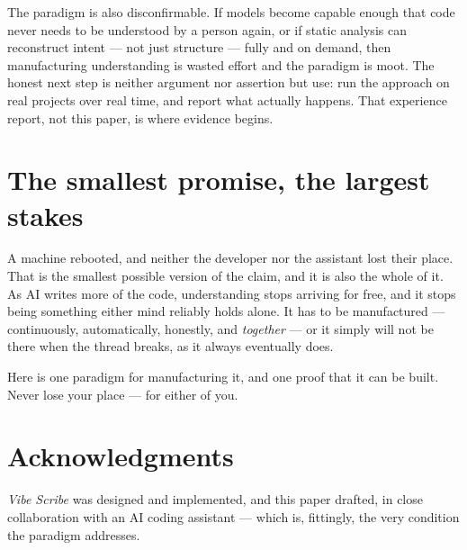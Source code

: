\documentclass[11pt]{article}
\newcommand{\vs}{\textit{Vibe Scribe}}
\begin{document}
The paradigm is also disconfirmable. If models become capable enough that code never needs to be
understood by a person again, or if static analysis can reconstruct intent --- not just structure ---
fully and on demand, then manufacturing understanding is wasted effort and the paradigm is moot. The
honest next step is neither argument nor assertion but use: run the approach on real projects over
real time, and report what actually happens. That experience report, not this paper, is where evidence
begins.

\section{The smallest promise, the largest stakes}

A machine rebooted, and neither the developer nor the assistant lost their place. That is the smallest
possible version of the claim, and it is also the whole of it. As AI writes more of the code,
understanding stops arriving for free, and it stops being something either mind reliably holds alone.
It has to be manufactured --- continuously, automatically, honestly, and \emph{together} --- or it
simply will not be there when the thread breaks, as it always eventually does.

Here is one paradigm for manufacturing it, and one proof that it can be built. Never lose your place
--- for either of you.

\section*{Acknowledgments}

\vs{} was designed and implemented, and this paper drafted, in close collaboration with an AI coding
assistant --- which is, fittingly, the very condition the paradigm addresses.
\end{document}
